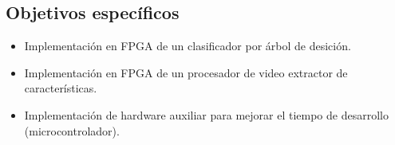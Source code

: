 \documentclass[twoside,spanish,ESP,MSc]{plantillaLabUPV}
\theoremstyle{definition}
\begin{document}
\subsection*{Objetivos específicos}
\begin{itemize}
 \item Implementación en FPGA de un clasificador por árbol de desición.
 \item Implementación en FPGA de un procesador de video extractor de características.
 \item Implementación de hardware  auxiliar para mejorar el tiempo de desarrollo (microcontrolador).

\end{itemize}

% 
\end{document}
